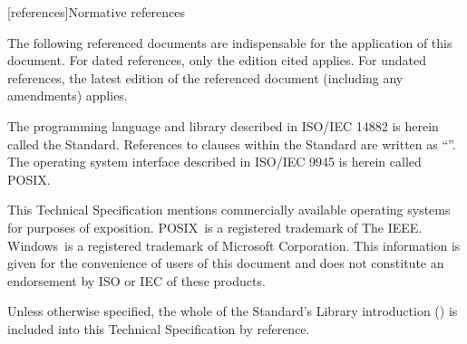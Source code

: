 
[references]{Normative references}

\pnum
The following referenced documents are indispensable for the application of this document. For dated references, only the edition cited applies. For undated references, the latest edition of the referenced document (including any amendments) applies.

\pnum
\begin{note} The programming language and library described in ISO/IEC 14882 is herein called the \Cpp Standard. References to clauses within the \Cpp Standard are written as ``''.  The operating system interface described in ISO/IEC 9945 is herein called POSIX. \end{note}

\pnum
This Technical Specification mentions commercially available operating systems for purposes of exposition.  POSIX\textregistered\ is a registered trademark of The IEEE. Windows\textregistered\ is a registered trademark of Microsoft Corporation. This information is given for the convenience of users of this document and does not constitute an endorsement by ISO or IEC of these products.

\pnum
Unless otherwise specified, the whole of the \Cpp Standard's Library introduction () is included into this Technical Specification by reference.


